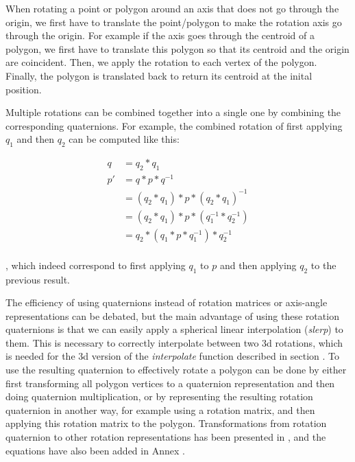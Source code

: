 		When rotating a point or polygon around an axis that does not go through the origin, we first have to translate the point/polygon to make the rotation axis go through the origin. For example if the axis goes through the centroid of a polygon, we first have to translate this polygon so that its centroid and the origin are coincident. Then, we apply the rotation to each vertex of the polygon. Finally, the polygon is translated back to return its centroid at the inital position.
		
		Multiple rotations can be combined together into a single one by combining the corresponding quaternions. For example, the combined rotation of first applying \( q_1 \) and then \( q_2 \) can be computed like this:
		
		\begin{equation}
		\begin{split}
			q 	& = q_2*q_1 \\
			p' 	& = q*p*q^{-1} \\
				& = (q_2*q_1)*p*(q_2*q_1)^{-1} \\
				& =  (q_2*q_1)*p*(q_1^{-1}*q_2^{-1}) \\
				& = q_2*(q_1*p*q_1^{-1})*q_2^{-1} \\
		\end{split}
		\end{equation}
		
		, which indeed correspond to first applying \( q_1 \) to \( p \) and then applying \( q_2 \) to the previous result.
		
		The efficiency of using quaternions instead of rotation matrices or axis-angle representations can be debated, but the main advantage of using these rotation quaternions is that we can easily apply a spherical linear interpolation (\textit{slerp}) to them. This is necessary to correctly interpolate between two 3d rotations, which is needed for the 3d version of the \textit{interpolate} function described in section . To use the resulting quaternion to effectively rotate a polygon can be done by either first transforming all polygon vertices to a quaternion representation and then doing quaternion multiplication, or by representing the resulting rotation quaternion in another way, for example using a rotation matrix, and then applying this rotation matrix to the polygon. Transformations from rotation quaternion to other rotation representations has been presented in \cite{ISO19141}, and the equations have also been added in Annex .
			
